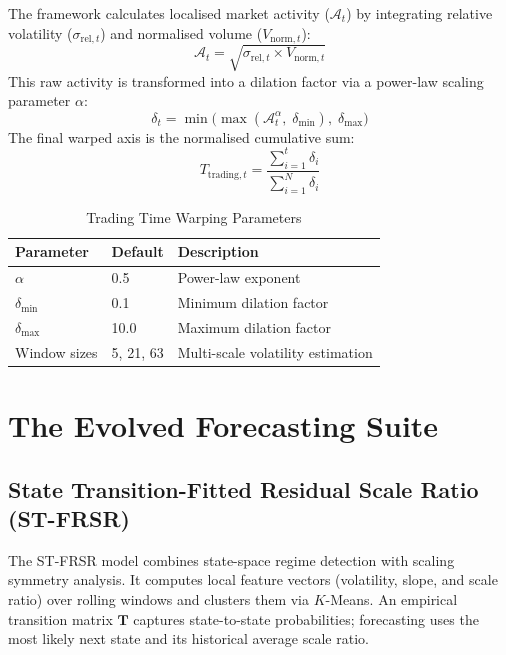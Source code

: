\documentclass[12pt,a4paper]{article}
\begin{document}
The framework calculates localised market activity ($\mathcal{A}_t$) by
integrating relative volatility ($\sigma_{\mathrm{rel},t}$) and normalised
volume ($V_{\mathrm{norm},t}$):
\begin{equation}
  \mathcal{A}_t = \sqrt{\sigma_{\mathrm{rel},t} \times V_{\mathrm{norm},t}}
  \label{eq:activity}
\end{equation}
This raw activity is transformed into a dilation factor via a power-law
scaling parameter $\alpha$:
\begin{equation}
  \delta_t =
    \min\!\bigl(\max(\mathcal{A}_t^\alpha,\;\delta_{\min}),\;\delta_{\max}\bigr)
  \label{eq:dilation}
\end{equation}
The final warped axis is the normalised cumulative sum:
\begin{equation}
  T_{\mathrm{trading},t} =
    \frac{\sum_{i=1}^{t}\delta_i}{\sum_{i=1}^{N}\delta_i}
  \label{eq:warpedaxis}
\end{equation}

\begin{table}[htbp]
  \centering
  \caption{Trading Time Warping Parameters}
  \label{tab:ttw_params}
  \begin{tabular}{lll}
    \toprule
    \textbf{Parameter} & \textbf{Default} & \textbf{Description} \\
    \midrule
    $\alpha$ & 0.5 & Power-law exponent \\
    $\delta_{\min}$ & 0.1 & Minimum dilation factor \\
    $\delta_{\max}$ & 10.0 & Maximum dilation factor \\
    Window sizes & 5, 21, 63 & Multi-scale volatility estimation \\
    \bottomrule
  \end{tabular}
\end{table}

\section{The Evolved Forecasting Suite}
\label{sec:forecasting}

\subsection{State Transition-Fitted Residual Scale Ratio (ST-FRSR)}
\label{sec:stfrsr}

The ST-FRSR model combines state-space regime detection with scaling
symmetry analysis.  It computes local feature vectors (volatility, slope,
and scale ratio) over rolling windows and clusters them via $K$-Means.
An empirical transition matrix $\mathbf{T}$ captures state-to-state
probabilities; forecasting uses the most likely next state and its
historical average scale ratio.
\end{document}
